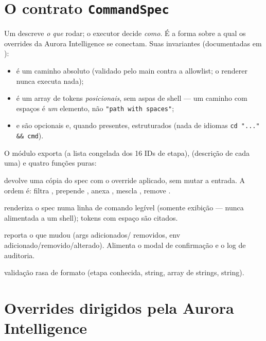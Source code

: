 \section{O contrato \texttt{CommandSpec}}
\label{sec:08-commandspec}

Um  descreve \emph{o que} rodar; o executor decide \emph{como}.
É a forma sobre a qual os overrides da Aurora Intelligence se conectam. Suas
invariantes (documentadas em ):

\begin{itemize}[leftmargin=1.4em]
  \item {} é um caminho absoluto (validado pelo main contra a
    allowlist; o renderer nunca executa nada);
  \item {} é um array de tokens \emph{posicionais}, sem aspas de shell —
    um caminho com espaços é \emph{um} elemento, não \lstinline|"path with spaces"|;
  \item {} e  são opcionais e, quando presentes, estruturados
    (nada de idiomas \lstinline|cd "..." && cmd|).
\end{itemize}

\noindent O módulo exporta  (a lista congelada dos 16 IDs de
etapa),  (descrição de cada uma) e quatro funções puras:

\begin{description}[leftmargin=1.4em]
  \item[\code{applyOverride(spec, ov)}] devolve uma cópia do spec com o override
    aplicado, sem mutar a entrada. A ordem é: filtra ,
    prepende , anexa , mescla ,
    remove .
  \item[\code{formatSpec(spec)}] renderiza o spec numa linha de comando legível
    (somente exibição — nunca alimentada a um shell); tokens com espaço são
    citados.
  \item[\code{diffSpecs(before, after)}] reporta o que mudou (args adicionados/
    removidos, env adicionado/removido/alterado). Alimenta o modal de
    confirmação e o log de auditoria.
  \item[\code{validateShape(spec)}] validação rasa de formato (etapa conhecida,
     string,  array de strings,  string).
\end{description}

\section{Overrides dirigidos pela Aurora Intelligence}
\label{sec:08-overrides}

